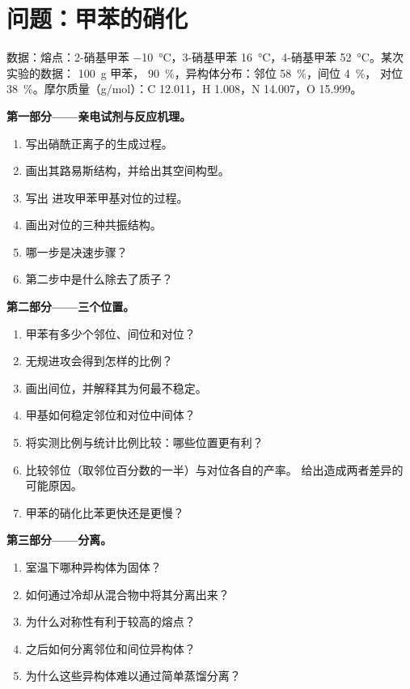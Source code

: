 \section{问题：甲苯的硝化}

\begin{problem}
\label{pb:b2:aromatic-substitution:1}
数据：熔点：2-硝基甲苯 \qty{-10}{\degreeCelsius}，3-硝基甲苯
\qty{16}{\degreeCelsius}，4-硝基甲苯 \qty{52}{\degreeCelsius}。某次实验的数据：
\qty{100}{g} 甲苯， 90~\%，异构体分布：邻位 58~\%，间位 4~\%，
对位 38~\%。摩尔质量（\unit{g/mol}）：C 12.011，H 1.008，N 14.007，O 15.999。

\medskip
\noindent\textbf{第一部分——亲电试剂与反应机理。}
\begin{enumerate}
  \item 写出硝酰正离子的生成过程。
  \item 画出其路易斯结构，并给出其空间构型。
  \item 写出  进攻甲苯甲基对位的过程。
  \item 画出对位的三种共振结构。
  \item 哪一步是决速步骤？
  \item 第二步中是什么除去了质子？
\end{enumerate}

\medskip
\noindent\textbf{第二部分——三个位置。}
\begin{enumerate}[resume]
  \item 甲苯有多少个邻位、间位和对位？
  \item 无规进攻会得到怎样的比例？
  \item 画出间位，并解释其为何最不稳定。
  \item 甲基如何稳定邻位和对位中间体？
  \item 将实测比例与统计比例比较：哪些位置更有利？
  \item 比较邻位（取邻位百分数的一半）与对位各自的产率。
        给出造成两者差异的可能原因。
  \item 甲苯的硝化比苯更快还是更慢？
\end{enumerate}

\medskip
\noindent\textbf{第三部分——分离。}
\begin{enumerate}[resume]
  \item 室温下哪种异构体为固体？
  \item 如何通过冷却从混合物中将其分离出来？
  \item 为什么对称性有利于较高的熔点？
  \item 之后如何分离邻位和间位异构体？
  \item 为什么这些异构体难以通过简单蒸馏分离？
\end{enumerate}


\end{problem}
